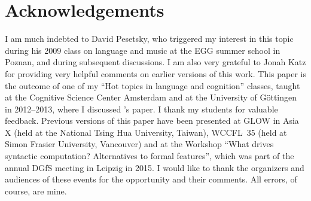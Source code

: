 \documentclass[output=paper]{langsci/langscibook}
\begin{document}
\printchapterglossary{}

\section*{Acknowledgements}

I am much indebted to David Pesetsky, who triggered my interest in this topic
during his 2009 class on language and music at the EGG summer school in Poznan,
and during subsequent discussions. I am also very grateful to Jonah Katz for
providing very helpful comments on earlier versions of this work. This paper is
the outcome of one of my “Hot topics in language and cognition” classes, taught
at the Cognitive Science Center Amsterdam and at the University of Göttingen in
2012–2013, where I discussed \citeauthor{KatzPes2011}’s paper. I thank my
students for valuable feedback.  Previous versions of this paper have been
presented at GLOW in Asia X (held at the National Tsing Hua University,
Taiwan), WCCFL~35 (held at Simon Frasier University, Vancouver) and at the
Workshop “What drives syntactic computation?  Alternatives to formal features”,
which was part of the annual DGfS meeting in Leipzig in 2015. I would like to
thank the organizers and audiences of these events for the opportunity and
their comments. All errors, of course, are mine.

{\sloppy
\printbibliography[heading=subbibliography,notkeyword=this]
}
\end{document}
